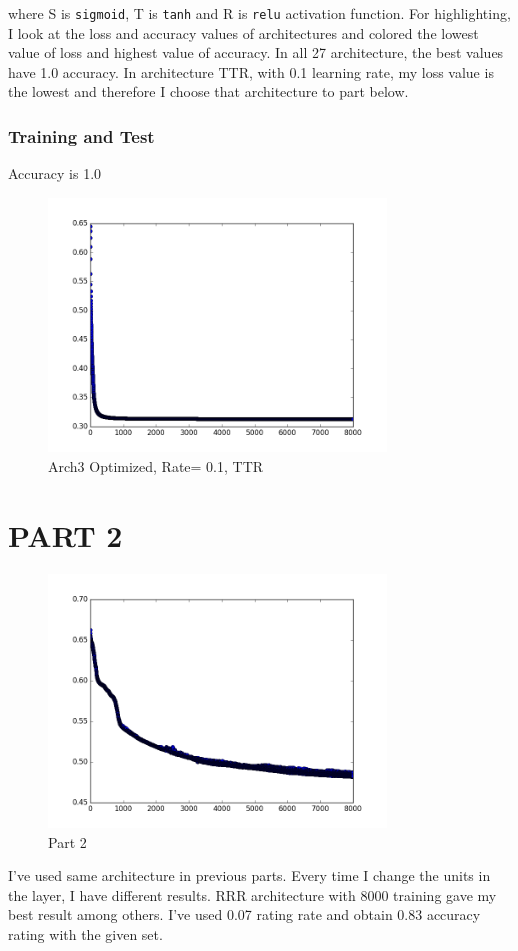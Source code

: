 \documentclass{article}
\begin{document}
where S is \verb|sigmoid|, T is \verb|tanh| and R is \verb|relu| activation function. For highlighting, I look at the loss and accuracy values of architectures and colored the lowest value of loss and highest value of accuracy. In all 27 architecture, the best values have 1.0 accuracy. In architecture TTR, with 0.1 learning rate, my loss value is the lowest and therefore I choose that architecture to part below.
\subsubsection{Training and Test}

Accuracy is 1.0

\begin{figure}[H]
  \caption{Arch3 Optimized, Rate= 0.1, TTR}
  \centering
  \includegraphics[width=0.8\textwidth]{arch3opt}
\end{figure}

\section{PART 2}

\begin{figure}[H]
  \caption{Part 2}
  \centering
  \includegraphics[width=0.8\textwidth]{part2}
\end{figure}

I've used same architecture in previous parts. Every time I change the units in the layer, I have different results. RRR architecture with 8000 training gave my best result among others. I've used 0.07 rating rate and  obtain 0.83 accuracy rating with the given set.
\end{document}

